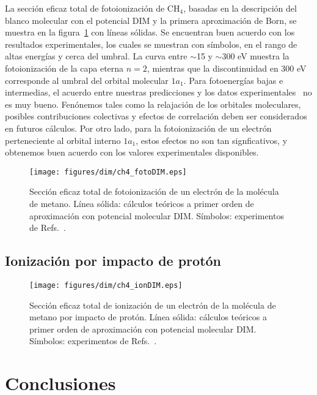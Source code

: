 La sección eficaz total de fotoionización de CH$_4$, basadas en la 
descripción del blanco molecular con el potencial DIM y la primera 
aproximación de Born, se muestra en la figura~\ref{fig:photoch4} con 
líneas sólidas. Se encuentran buen acuerdo con los resultados 
experimentales, los cuales se muestran con símbolos, en el rango de
altas energías y cerca del umbral. La curva entre $\sim$15 y 
$\sim$300 eV muestra la fotoionización de la capa eterna $n=2$, mientras
que la discontinuidad en 300 eV corresponde al umbral del orbital 
molecular $1a_1$. Para fotoenergías bajas e intermedias, el acuerdo entre 
nuestras predicciones y los datos 
experimentales~\cite{Lukirskii:64,Henke:82,Samson:89} no es muy bueno.
Fenónemos tales como la relajación de los orbitales moleculares, posibles
contribuciones colectivas y efectos de correlación deben ser considerados 
en futuros cálculos. Por otro lado, para la fotoionización de un electrón
perteneciente al orbital interno $1a_1$, estos efectos no son tan 
signficativos, y obtenemos buen acuerdo con los valores experimentales
disponibles.

\begin{figure}[t]
\centering
 \texttt{[image: figures/dim/ch4\_fotoDIM.eps]}
\caption[Fotoionización de metano.]
{Sección eficaz total de fotoionización de un electrón de la
molécula de metano. Línea sólida: cálculos teóricos a primer orden de 
aproximación con potencial molecular DIM. Símbolos: experimentos de 
Refs.~\cite{Lukirskii:64,Henke:82,Samson:89}.}
\label{fig:photoch4}
\end{figure}

\subsection{Ionización por impacto de protón}

\begin{figure}[t]
\centering
 \texttt{[image: figures/dim/ch4\_ionDIM.eps]}
\caption[Ionización de metano por impacto de protón.]
{Sección eficaz total de ionización de un electrón de la
molécula de metano por impacto de protón. Línea sólida: cálculos 
teóricos a primer orden de aproximación con potencial molecular DIM. 
Símbolos: experimentos de Refs.~\cite{Rudd:83,Rudd:85}.}
\label{fig:ionch4}
\end{figure}

\newpage
\section{Conclusiones}
\label{conclusion}


